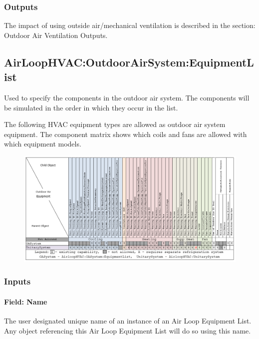 \subsubsection{Outputs}\label{outputs-2-001}

The impact of using outside air/mechanical ventilation is described in the section: Outdoor Air Ventilation Outputs.

\subsection{AirLoopHVAC:OutdoorAirSystem:EquipmentList}\label{airloophvacoutdoorairsystemequipmentlist}

Used to specify the components in the outdoor air system. The components will be simulated in the order in which they occur in the list.

The following HVAC equipment types are allowed as outdoor air system equipment. The component matrix shows which coils and fans are allowed with which equipment models.

\begin{figure}[htbp]
\centering
\includegraphics{media/OASysComponentMatrix.png}
\caption{}
\end{figure}

\subsubsection{Inputs}\label{inputs-4-001}

\paragraph{Field: Name}\label{field-name-4-001}

The user designated unique name of an instance of an Air Loop Equipment List. Any object referencing this Air Loop Equipment List will do so using this name.

